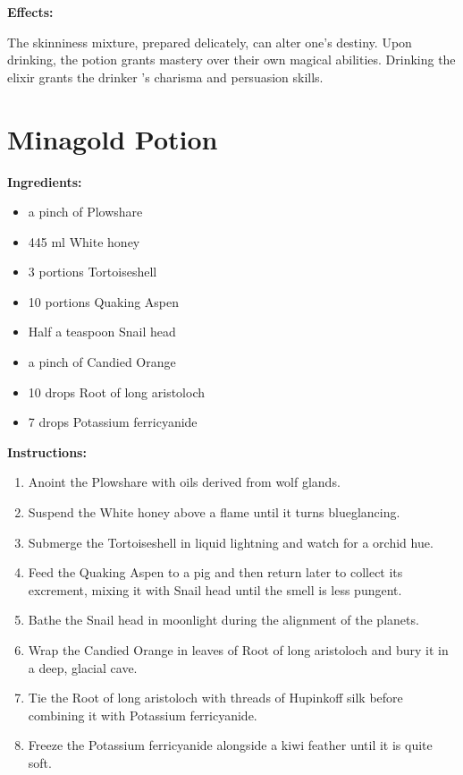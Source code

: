 \documentclass{article}
\begin{document}
\textbf{Effects:}

The skinniness mixture, prepared delicately, can alter one's destiny. Upon drinking, the potion grants mastery over their own magical abilities. Drinking the elixir grants the drinker 's charisma and persuasion skills.

\newpage
\section*{Minagold Potion}

\textbf{Ingredients:}

\begin{itemize}
  \item a pinch of Plowshare
  \item 445 ml White honey
  \item 3 portions Tortoiseshell
  \item 10 portions Quaking Aspen
  \item Half a teaspoon Snail head
  \item a pinch of Candied Orange
  \item 10 drops Root of  long aristoloch
  \item 7 drops Potassium ferricyanide
\end{itemize}

\textbf{Instructions:}

\begin{enumerate}
  \item Anoint the Plowshare with oils derived from wolf glands.
  \item Suspend the White honey above a flame until it turns blueglancing.
  \item Submerge the Tortoiseshell in liquid lightning and watch for a orchid hue.
  \item Feed the Quaking Aspen to a pig and then return later to collect its excrement, mixing it with Snail head until the smell is less pungent.
  \item Bathe the Snail head in moonlight during the alignment of the planets.
  \item Wrap the Candied Orange in leaves of Root of  long aristoloch and bury it in a deep, glacial cave.
  \item Tie the Root of  long aristoloch with threads of Hupinkoff silk before combining it with Potassium ferricyanide.
  \item Freeze the Potassium ferricyanide alongside a kiwi feather until it is quite soft.
\end{enumerate}
\end{document}

